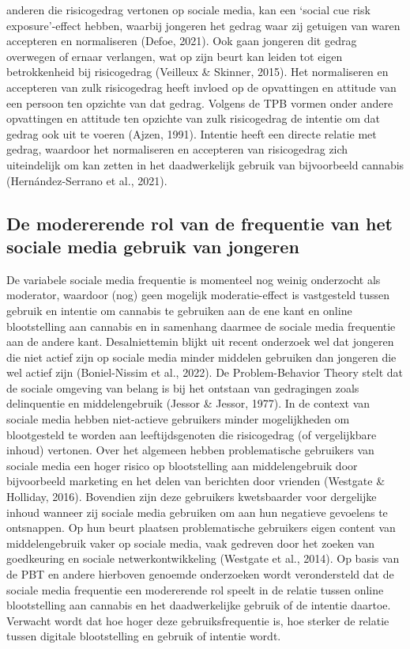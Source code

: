 \documentclass[
  letterpaper,
  DIV=11,
  numbers=noendperiod]{scrartcl}
\begin{document}
anderen die risicogedrag vertonen op sociale media, kan een `social cue
risk exposure'-effect hebben, waarbij jongeren het gedrag waar zij
getuigen van waren accepteren en normaliseren (Defoe, 2021). Ook gaan
jongeren dit gedrag overwegen of ernaar verlangen, wat op zijn beurt kan
leiden tot eigen betrokkenheid bij risicogedrag (Veilleux \& Skinner,
2015). Het normaliseren en accepteren van zulk risicogedrag heeft
invloed op de opvattingen en attitude van een persoon ten opzichte van
dat gedrag. Volgens de TPB vormen onder andere opvattingen en attitude
ten opzichte van zulk risicogedrag de intentie om dat gedrag ook uit te
voeren (Ajzen, 1991). Intentie heeft een directe relatie met gedrag,
waardoor het normaliseren en accepteren van risicogedrag zich
uiteindelijk om kan zetten in het daadwerkelijk gebruik van bijvoorbeeld
cannabis (Hernández-Serrano et al., 2021).

\hypertarget{de-modererende-rol-van-de-frequentie-van-het-sociale-media-gebruik-van-jongeren}{%
\subsection{De modererende rol van de frequentie van het sociale media
gebruik van
jongeren}\label{de-modererende-rol-van-de-frequentie-van-het-sociale-media-gebruik-van-jongeren}}

De variabele sociale media frequentie is momenteel nog weinig onderzocht
als moderator, waardoor (nog) geen mogelijk moderatie-effect is
vastgesteld tussen gebruik en intentie om cannabis te gebruiken aan de
ene kant en online blootstelling aan cannabis en in samenhang daarmee de
sociale media frequentie aan de andere kant. Desalniettemin blijkt uit
recent onderzoek wel dat jongeren die niet actief zijn op sociale media
minder middelen gebruiken dan jongeren die wel actief zijn
(Boniel-Nissim et al., 2022). De Problem-Behavior Theory stelt dat de
sociale omgeving van belang is bij het ontstaan van gedragingen zoals
delinquentie en middelengebruik (Jessor \& Jessor, 1977). In de context
van sociale media hebben niet-actieve gebruikers minder mogelijkheden om
blootgesteld te worden aan leeftijdsgenoten die risicogedrag (of
vergelijkbare inhoud) vertonen. Over het algemeen hebben problematische
gebruikers van sociale media een hoger risico op blootstelling aan
middelengebruik door bijvoorbeeld marketing en het delen van berichten
door vrienden (Westgate \& Holliday, 2016). Bovendien zijn deze
gebruikers kwetsbaarder voor dergelijke inhoud wanneer zij sociale media
gebruiken om aan hun negatieve gevoelens te ontsnappen. Op hun beurt
plaatsen problematische gebruikers eigen content van middelengebruik
vaker op sociale media, vaak gedreven door het zoeken van goedkeuring en
sociale netwerkontwikkeling (Westgate et al., 2014). Op basis van de PBT
en andere hierboven genoemde onderzoeken wordt verondersteld dat de
sociale media frequentie een modererende rol speelt in de relatie tussen
online blootstelling aan cannabis en het daadwerkelijke gebruik of de
intentie daartoe. Verwacht wordt dat hoe hoger deze gebruiksfrequentie
is, hoe sterker de relatie tussen digitale blootstelling en gebruik of
intentie wordt.
\end{document}
